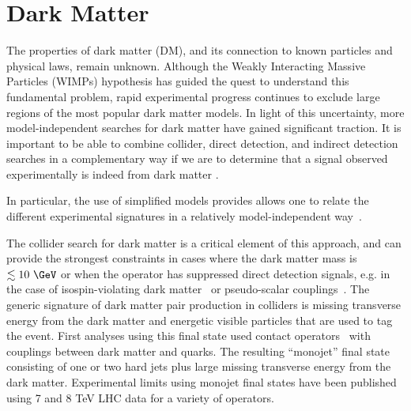 \section{Dark Matter}
\label{sec:dm}


The properties of dark matter (DM), and its connection to known particles and physical laws, remain unknown. Although the Weakly Interacting Massive Particles (WIMPs) hypothesis has guided the
quest to understand this fundamental problem, rapid experimental progress continues to exclude large regions of the most popular dark matter models. In light of this uncertainty, more model-independent searches for dark matter have gained significant traction. It is important to be able to combine collider, direct detection, and indirect detection searches in a complementary way if we are to
determine that a signal observed experimentally is indeed from dark matter \cite{Bauer:2013ihz}.

In particular, the use of simplified models provides allows one to relate the different experimental
signatures in a relatively model-independent way~\cite{Buchmueller:2014yoa}. 



The collider search for dark matter is a critical element of this approach, and can provide the strongest constraints in cases where the
dark matter mass is $\lesssim 10\ \GeV$ or when the operator has suppressed direct detection signals, e.g. in the case of isospin-violating dark matter~\cite{Feng:2011vu} or pseudo-scalar couplings~\cite{Buckley:2014fba}.  The generic signature of dark matter pair production in colliders is missing transverse energy from the dark matter and energetic visible particles that are used to tag
the event.  First analyses using this final state used contact operators~\cite{Goodman:2010ku} with couplings between dark matter and quarks. The resulting ``monojet'' final state
consisting of one or two hard jets plus large missing transverse energy from the dark matter. Experimental limits using monojet final
states have been published using 7 and 8 TeV LHC data \cite{Chatrchyan:2012me,ATLAS:2012ky}
for a variety of operators. 


